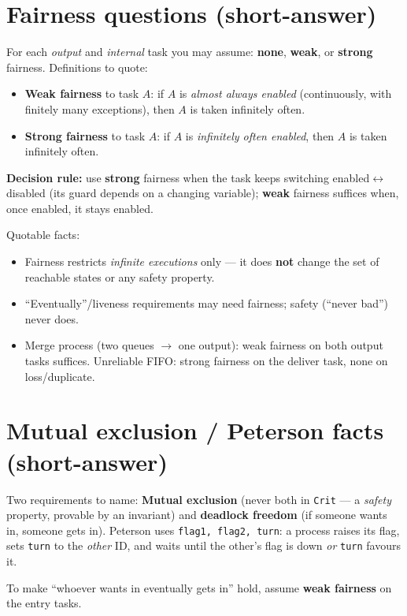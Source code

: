 \section{Fairness questions (short-answer)}
For each \emph{output} and \emph{internal} task you may assume: \textbf{none}, \textbf{weak}, or \textbf{strong} fairness. Definitions to quote:
\begin{itemize}
  \item \textbf{Weak fairness} to task $A$: if $A$ is \emph{almost always enabled} (continuously, with finitely many exceptions), then $A$ is taken infinitely often.
  \item \textbf{Strong fairness} to task $A$: if $A$ is \emph{infinitely often enabled}, then $A$ is taken infinitely often.
\end{itemize}
\begin{keybox}
\textbf{Decision rule:} use \textbf{strong} fairness when the task keeps switching enabled$\leftrightarrow$disabled (its guard depends on a changing variable); \textbf{weak} fairness suffices when, once enabled, it stays enabled.
\end{keybox}
Quotable facts:
\begin{itemize}
  \item Fairness restricts \emph{infinite executions} only --- it does \textbf{not} change the set of reachable states or any safety property.
  \item ``Eventually''/liveness requirements may need fairness; safety (``never bad'') never does.
  \item Merge process (two queues $\to$ one output): weak fairness on both output tasks suffices. Unreliable FIFO: strong fairness on the deliver task, none on loss/duplicate.
\end{itemize}

\section{Mutual exclusion / Peterson facts (short-answer)}
Two requirements to name: \textbf{Mutual exclusion} (never both in \texttt{Crit} --- a \emph{safety} property, provable by an invariant) and \textbf{deadlock freedom} (if someone wants in, someone gets in). Peterson uses \texttt{flag1, flag2, turn}: a process raises its flag, sets \texttt{turn} to the \emph{other} ID, and waits until the other's flag is down \emph{or} \texttt{turn} favours it.
\begin{keybox}
To make ``whoever wants in eventually gets in'' hold, assume \textbf{weak fairness} on the entry tasks.
\end{keybox}

